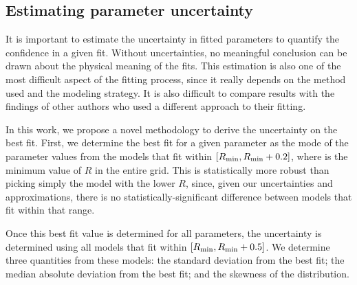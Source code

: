 %


\subsection{Estimating parameter uncertainty}

It is important to estimate the uncertainty in fitted parameters
 to quantify the confidence in a given fit. Without uncertainties, no meaningful conclusion can be drawn about the physical meaning of the fits. This estimation is also one of the most difficult aspect of the fitting process, since it really depends on the method used and the modeling strategy. It is also difficult to compare results with the findings of other authors who used a different approach to their fitting. 

In this work, we propose a novel methodology to derive the uncertainty on the best fit. First, we determine the best fit for a given parameter as the mode of the parameter values from the models that fit within $[R_\textrm{min},R_\textrm{min}+0.2]$, where \Rmin is the minimum value of $R$ in the entire grid. This is statistically more robust than picking simply the model with the lower $R$, since, given our uncertainties and approximations, there is no statistically-significant difference between models that fit within that range.

Once this best fit value is determined for all parameters, the uncertainty is determined using all models that fit within $[R_\textrm{min},R_\textrm{min}+0.5]$. We determine three quantities from these models: the standard deviation from the best fit; the median absolute deviation from the best fit; and the skewness of the distribution. %

